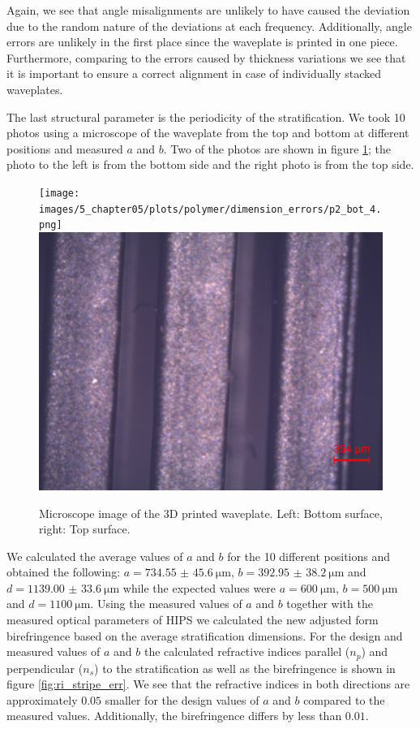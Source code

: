 Again, we see that angle misalignments are unlikely to have caused the deviation due to the random nature of the deviations at each frequency. Additionally, angle errors are unlikely in the first place since the waveplate is printed in one piece. Furthermore, comparing to the errors caused by thickness variations we see that it is important to ensure a correct alignment in case of individually stacked waveplates. 

The last structural parameter is the periodicity of the stratification. We took 10 photos using a microscope of the waveplate from the top and bottom at different positions and measured $a$ and $b$. Two of the photos are shown in figure \ref{fig:hips_wp_photos}; the photo to
the left is from the bottom side and the right photo is from the top side.

\begin{figure}[H]
\centering
    \subcaptionbox{\label{fig:p2bot4}}
        {\hspace*{-2em}\texttt{[image: images/5\_chapter05/plots/polymer/dimension\_errors/p2\_bot\_4.png]}}
    \qquad
    \subcaptionbox{\label{fig:p2top2}}
        {\hspace*{-2em}\includegraphics[width=0.47\linewidth]{images/5_chapter05/plots/polymer/dimension_errors/p2_top_2.png}}
    \caption{Microscope image of the 3D printed waveplate. Left: Bottom surface, right: Top surface.}
\label{fig:hips_wp_photos}
\end{figure}

We calculated the average values of $a$ and $b$ for the 10 different positions and obtained the following: $a=\SI[separate-uncertainty = true]{734.55(4560)}{\micro \meter}$, $b=\SI[separate-uncertainty = true]{392.95(3820)}{\micro \meter}$ and $d=\SI[separate-uncertainty = true]{1139.00(3360)}{\micro \meter}$ while the expected values were $a=\SI{600}{\micro \meter}$, $b=\SI{500}{\micro \meter}$ and $d=\SI{1100}{\micro \meter}$. Using the measured values of $a$ and $b$ together with the measured optical parameters of HIPS we calculated the new adjusted form birefringence based on the average stratification dimensions. For the design and measured values of $a$ and $b$ the calculated refractive indices parallel ($n_p$) and perpendicular ($n_s$) to the stratification as well as the birefringence is shown in figure \ref{fig:ri_stripe_err}. We see that the refractive indices in both directions are approximately $0.05$ smaller for the design values of $a$ and $b$ compared to the measured values. Additionally, the birefringence differs by less than $0.01$.

